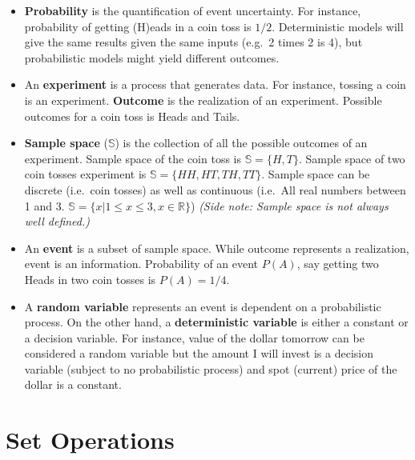 \documentclass[]{book}
\theoremstyle{definition}
\theoremstyle{definition}
\theoremstyle{definition}
\theoremstyle{remark}
\begin{document}
\begin{itemize}
\item
  \textbf{Probability} is the quantification of event uncertainty. For
  instance, probability of getting (H)eads in a coin toss is \(1/2\).
  Deterministic models will give the same results given the same inputs
  (e.g.~2 times 2 is 4), but probabilistic models might yield different
  outcomes.
\item
  An \textbf{experiment} is a process that generates data. For instance,
  tossing a coin is an experiment. \textbf{Outcome} is the realization
  of an experiment. Possible outcomes for a coin toss is Heads and
  Tails.
\item
  \textbf{Sample space} (\(\mathbb{S}\)) is the collection of all the
  possible outcomes of an experiment. Sample space of the coin toss is
  \(\mathbb{S} = \{H,T\}\). Sample space of two coin tosses experiment
  is \(\mathbb{S} = \{HH,HT,TH,TT\}\). Sample space can be discrete
  (i.e.~coin tosses) as well as continuous (i.e.~All real numbers
  between 1 and 3.
  \(\mathbb{S} = \{x | 1 \le x \le 3, x \in \mathbb{R}\}\)) \emph{(Side
  note: Sample space is not always well defined.)}
\item
  An \textbf{event} is a subset of sample space. While outcome
  represents a realization, event is an information. Probability of an
  event \(P(A)\), say getting two Heads in two coin tosses is
  \(P(A) = 1/4\).
\item
  A \textbf{random variable} represents an event is dependent on a
  probabilistic process. On the other hand, a \textbf{deterministic
  variable} is either a constant or a decision variable. For instance,
  value of the dollar tomorrow can be considered a random variable but
  the amount I will invest is a decision variable (subject to no
  probabilistic process) and spot (current) price of the dollar is a
  constant.
\end{itemize}

\hypertarget{set-operations}{%
\section{Set Operations}\label{set-operations}}
\end{document}
